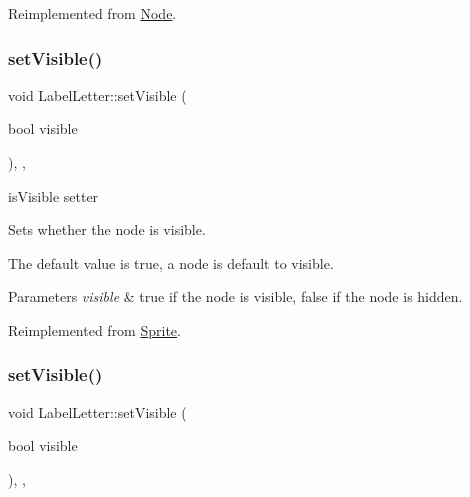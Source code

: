 Reimplemented from \hyperlink{classNode_accff189524c62c6cb446cc19e3a79ab4}{Node}.

\mbox{\label{classLabelLetter_aa46db980ecd91de0f00c7aee1f2f52f9}} 
\subsubsection{\texorpdfstring{set\+Visible()}{setVisible()}\hspace{0.1cm}{\footnotesize\ttfamily [1/2]}}
{\footnotesize\ttfamily void Label\+Letter\+::set\+Visible (\begin{DoxyParamCaption}\item[{bool}]{visible }\end{DoxyParamCaption})\hspace{0.3cm}{\ttfamily [inline]}, {\ttfamily [override]}, {\ttfamily [virtual]}}



is\+Visible setter 

Sets whether the node is visible.

The default value is true, a node is default to visible.


\begin{DoxyParams}{Parameters}
{\em visible} & true if the node is visible, false if the node is hidden. \\
\hline
\end{DoxyParams}


Reimplemented from \hyperlink{classSprite_abdaaa50259a13af3d6e8effded4ba42b}{Sprite}.

\mbox{\label{classLabelLetter_aa46db980ecd91de0f00c7aee1f2f52f9}} 
\subsubsection{\texorpdfstring{set\+Visible()}{setVisible()}\hspace{0.1cm}{\footnotesize\ttfamily [2/2]}}
{\footnotesize\ttfamily void Label\+Letter\+::set\+Visible (\begin{DoxyParamCaption}\item[{bool}]{visible }\end{DoxyParamCaption})\hspace{0.3cm}{\ttfamily [inline]}, {\ttfamily [override]}, {\ttfamily [virtual]}}



